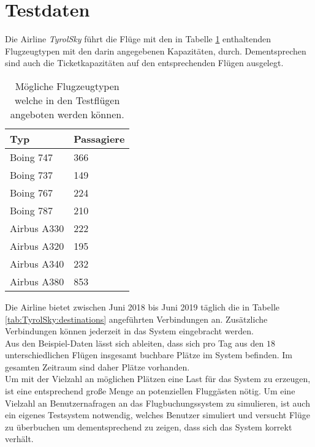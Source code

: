 \section{Testdaten}
\label{sec:eruierung:testdata}
Die Airline \textit{TyrolSky} führt die Flüge mit den in Tabelle \ref{tab:TyrolSky:airplanes} enthaltenden Flugzeugtypen mit den darin angegebenen Kapazitäten, durch. Dementsprechen sind auch die Ticketkapazitäten auf den entsprechenden Flügen ausgelegt.
\begin{table}[]
  \centering
  \begin{tabular}{ll}
  Typ & Passagiere \\ \hline
  Boing 747  &  366    \\
  Boing 737  &  149    \\
  Boing 767  &  224    \\
  Boing 787  &  210    \\
  Airbus A330  &  222    \\
  Airbus A320  &  195    \\
  Airbus A340  &  232    \\
  Airbus A380  &  853    \\  
\end{tabular}
\caption{Mögliche Flugzeugtypen welche in den Testflügen angeboten werden können.}
\label{tab:TyrolSky:airplanes}
\end{table}
Die Airline bietet zwischen Juni 2018 bis Juni 2019 täglich die in Tabelle \ref{tab:TyrolSky:destinations} angeführten Verbindungen an. Zusätzliche Verbindungen können jederzeit in das System eingebracht werden. \\
Aus den Beispiel-Daten lässt sich ableiten, dass sich pro Tag aus den $18$ unterschiedlichen Flügen insgesamt  buchbare Plätze im System befinden. Im gesamten Zeitraum sind daher  Plätze vorhanden. \\
Um mit der Vielzahl an möglichen Plätzen eine Last für das System zu erzeugen, ist eine entsprechend große Menge an potenziellen Fluggästen nötig. Um eine Vielzahl an Benutzernafragen an das Flugbuchungssystem zu simulieren, ist auch ein eigenes Testsystem notwendig, welches Benutzer simuliert und versucht Flüge zu überbuchen um dementsprechend zu zeigen, dass sich das System korrekt verhält. 

